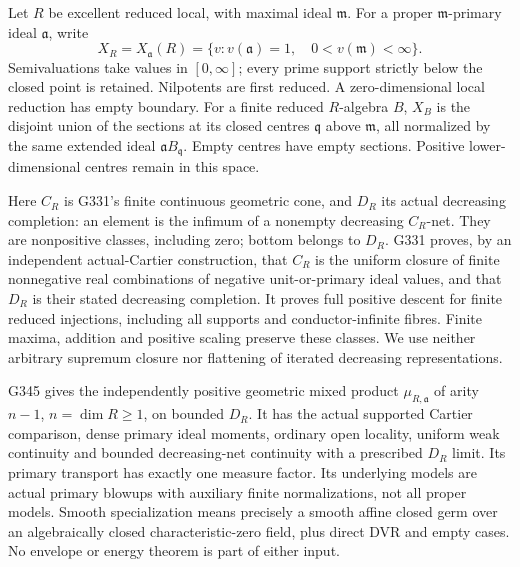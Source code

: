 \documentclass[11pt]{article}
\begin{document}
Let \(R\) be excellent reduced local, with maximal ideal \(\mathfrak m\).
For a proper \(\mathfrak m\)-primary ideal \(\mathfrak a\), write
\[
 X_R=X_{\mathfrak a}(R)=\{v: v(\mathfrak a)=1,\quad
                    0<v(\mathfrak m)<\infty\}.
\]
Semivaluations take values in \([0,\infty]\); every prime support strictly
below the closed point is retained. Nilpotents are first reduced. A
zero-dimensional local reduction has empty boundary.
For a finite reduced \(R\)-algebra \(B\), \(X_B\) is the disjoint union
of the sections at its closed centres \(\mathfrak q\) above \(\mathfrak m\),
all normalized by the same extended ideal \(\mathfrak a B_{\mathfrak q}\).
Empty centres have empty sections. Positive lower-dimensional centres
remain in this space.

Here \(C_R\) is G331's finite continuous geometric cone, and \(D_R\) its
actual decreasing completion: an element is the infimum of a nonempty
decreasing \(C_R\)-net. They are nonpositive classes, including zero;
bottom belongs to \(D_R\). G331 proves, by an independent actual-Cartier
construction, that \(C_R\) is the uniform closure of finite nonnegative
real combinations of negative unit-or-primary ideal values, and that
\(D_R\) is their stated decreasing completion. It proves full positive
descent for finite reduced injections, including all supports and
conductor-infinite fibres. Finite maxima, addition and positive scaling
preserve these classes. We use neither arbitrary supremum closure nor
flattening of iterated decreasing representations.

G345 gives the independently positive geometric mixed product
\(\mu_{R,\mathfrak a}\) of arity \(n-1\), \(n=\dim R\geq1\), on bounded
\(D_R\). It has the actual supported Cartier comparison, dense primary
ideal moments, ordinary open locality, uniform weak continuity and
bounded decreasing-net continuity with a prescribed \(D_R\) limit.
Its primary transport has exactly one measure factor. Its underlying
models are actual primary blowups with auxiliary finite normalizations,
not all proper models. Smooth specialization means precisely a smooth
affine closed germ over an algebraically closed characteristic-zero
field, plus direct DVR and empty cases. No envelope or energy theorem
is part of either input.
\end{document}
